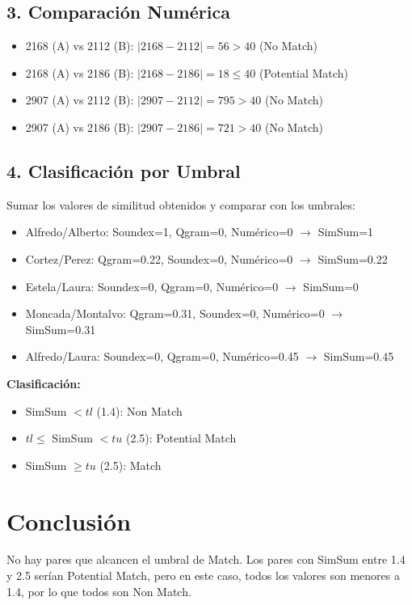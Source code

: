 \documentclass{article}
\begin{document}
\subsection*{3. Comparación Numérica}

\begin{itemize}
    \item 2168 (A) vs 2112 (B): $|2168-2112| = 56 > 40$ (No Match)
    \item 2168 (A) vs 2186 (B): $|2168-2186| = 18 \leq 40$ (Potential Match)
    \item 2907 (A) vs 2112 (B): $|2907-2112| = 795 > 40$ (No Match)
    \item 2907 (A) vs 2186 (B): $|2907-2186| = 721 > 40$ (No Match)
\end{itemize}

\subsection*{4. Clasificación por Umbral}

Sumar los valores de similitud obtenidos y comparar con los umbrales:

\begin{itemize}
    \item Alfredo/Alberto: Soundex=1, Qgram=0, Numérico=0 $\rightarrow$ SimSum=1
    \item Cortez/Perez: Qgram=0.22, Soundex=0, Numérico=0 $\rightarrow$ SimSum=0.22
    \item Estela/Laura: Soundex=0, Qgram=0, Numérico=0 $\rightarrow$ SimSum=0
    \item Moncada/Montalvo: Qgram=0.31, Soundex=0, Numérico=0 $\rightarrow$ SimSum=0.31
    \item Alfredo/Laura: Soundex=0, Qgram=0, Numérico=0.45 $\rightarrow$ SimSum=0.45
\end{itemize}

\textbf{Clasificación:}
\begin{itemize}
    \item SimSum $< tl$ (1.4): Non Match
    \item $tl \leq$ SimSum $< tu$ (2.5): Potential Match
    \item SimSum $\geq tu$ (2.5): Match
\end{itemize}

\section*{Conclusión}

No hay pares que alcancen el umbral de Match. Los pares con SimSum entre 1.4 y 2.5 serían Potential Match, pero en este caso, todos los valores son menores a 1.4, por lo que todos son Non Match.
\end{document}
